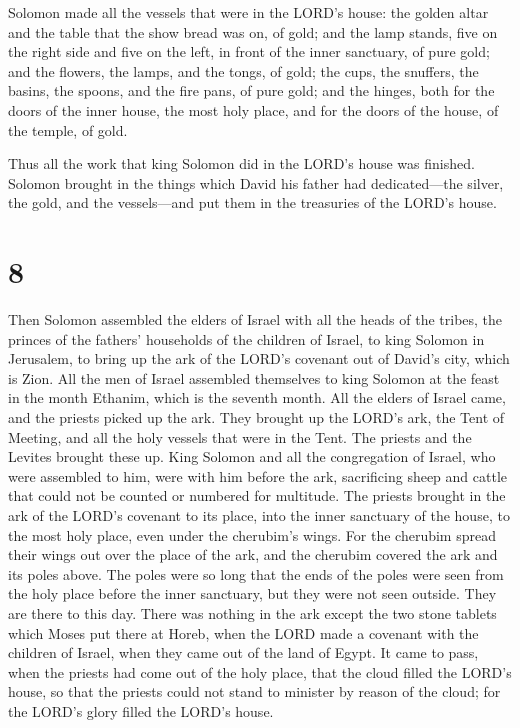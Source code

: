  Solomon made all the vessels that were in the LORD's
house: the golden altar and the table that the show bread was on, of
gold;  and the lamp stands, five on the right side and five
on the left, in front of the inner sanctuary, of pure gold; and the
flowers, the lamps, and the tongs, of gold;  the cups, the
snuffers, the basins, the spoons, and the fire pans, of pure gold; and
the hinges, both for the doors of the inner house, the most holy place,
and for the doors of the house, of the temple, of gold.

 Thus all the work that king Solomon did in the LORD's
house was finished. Solomon brought in the things which David his father
had dedicated---the silver, the gold, and the vessels---and put them in
the treasuries of the LORD's house.

\hypertarget{section-7}{%
\section{8}\label{section-7}}

 Then Solomon assembled the elders of Israel with all the
heads of the tribes, the princes of the fathers' households of the
children of Israel, to king Solomon in Jerusalem, to bring up the ark of
the LORD's covenant out of David's city, which is Zion.  All
the men of Israel assembled themselves to king Solomon at the feast in
the month Ethanim, which is the seventh month.  All the
elders of Israel came, and the priests picked up the ark. 
They brought up the LORD's ark, the Tent of Meeting, and all the holy
vessels that were in the Tent. The priests and the Levites brought these
up.  King Solomon and all the congregation of Israel, who
were assembled to him, were with him before the ark, sacrificing sheep
and cattle that could not be counted or numbered for multitude.
 The priests brought in the ark of the LORD's covenant to
its place, into the inner sanctuary of the house, to the most holy
place, even under the cherubim's wings.  For the cherubim
spread their wings out over the place of the ark, and the cherubim
covered the ark and its poles above.  The poles were so long
that the ends of the poles were seen from the holy place before the
inner sanctuary, but they were not seen outside. They are there to this
day.  There was nothing in the ark except the two stone
tablets which Moses put there at Horeb, when the LORD made a covenant
with the children of Israel, when they came out of the land of Egypt.
 It came to pass, when the priests had come out of the holy
place, that the cloud filled the LORD's house,  so that the
priests could not stand to minister by reason of the cloud; for the
LORD's glory filled the LORD's house.

